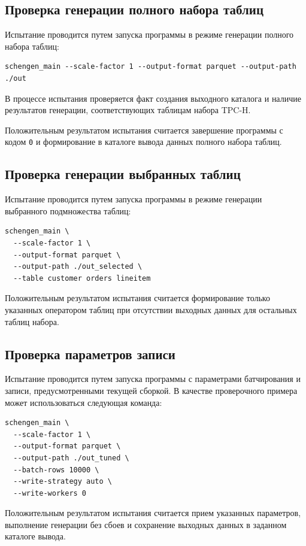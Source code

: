 \subsection{Проверка генерации полного набора таблиц}

Испытание проводится путем запуска программы в режиме генерации полного набора
таблиц:
\begin{verbatim}
schengen_main --scale-factor 1 --output-format parquet --output-path ./out
\end{verbatim}

В процессе испытания проверяется факт создания выходного каталога и наличие
результатов генерации, соответствующих таблицам набора TPC-H.

Положительным результатом испытания считается завершение программы с кодом
\texttt{0} и формирование в каталоге вывода данных полного набора таблиц.

\subsection{Проверка генерации выбранных таблиц}

Испытание проводится путем запуска программы в режиме генерации выбранного
подмножества таблиц:
\begin{verbatim}
schengen_main \
  --scale-factor 1 \
  --output-format parquet \
  --output-path ./out_selected \
  --table customer orders lineitem
\end{verbatim}

Положительным результатом испытания считается формирование только указанных
оператором таблиц при отсутствии выходных данных для остальных таблиц набора.

\subsection{Проверка параметров записи}

Испытание проводится путем запуска программы с параметрами батчирования и
записи, предусмотренными текущей сборкой. В качестве проверочного примера может
использоваться следующая команда:
\begin{verbatim}
schengen_main \
  --scale-factor 1 \
  --output-format parquet \
  --output-path ./out_tuned \
  --batch-rows 10000 \
  --write-strategy auto \
  --write-workers 0
\end{verbatim}

Положительным результатом испытания считается прием указанных параметров,
выполнение генерации без сбоев и сохранение выходных данных в заданном каталоге
вывода.

